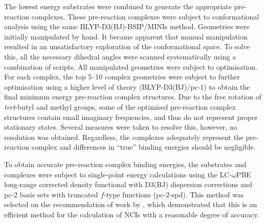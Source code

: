 The lowest energy substrates were combined to generate the appropriate pre-reaction complexes. These pre-reaction complexes were subject to conformational analysis using the same BLYP-D3(BJ)-BSIP/MINIs method. Geometries were initially manipulated by hand. It became apparent that manual manipulation resulted in an unsatisfactory exploration of the conformational space. To solve this, all the necessary dihedral angles were scanned systematically using a combination of scripts.\cite{note5} All manipulated geometries were subject to optimisation. For each complex, the top 5--10 complex geometries were subject to further optimisation using a higher level of theory (BLYP-D3(BJ)/pc-1) to obtain the final minimum energy pre-reaction complex structures. Due to the free rotation of \emph{tert}-butyl and methyl groups, some of the optimised pre-reaction complex structures contain small imaginary frequencies, and thus do not represent proper stationary states. Several measures were taken to resolve this, however, no resolution was obtained. Regardless, the complexes adequately represent the pre-reaction complex and differences in ``true'' binding energies should be negligible.

To obtain accurate pre-reaction complex binding energies, the substrates and complexes were subject to single-point energy calculations using the LC-$\omega$PBE long-range corrected density functional\cite{Vydrov2006,Vydrov2006a} with D3(BJ) dispersion corrections and pc-2 basis sets with truncated $f$-type functions (pc-2-spd).\cite{Johnson2013} This method was selected on the recommendation of work by \citet{Johnson2013}, which demonstrated that this is an efficient method for the calculation of NCIs with a reasonable degree of accuracy.
